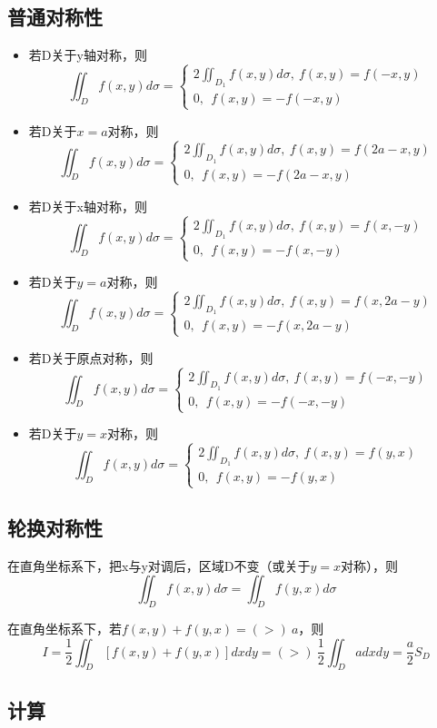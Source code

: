 \subsection{普通对称性}
\begin{itemize}
    \item 若D关于y轴对称，则\[\iint_Df(x, y)d\sigma = \begin{cases}
        2\iint_{D_1}f(x, y)d\sigma,\ f(x, y) = f(-x, y) \\
        0,\ \ f(x, y) = -f(-x, y)
    \end{cases}\]

    \item 若D关于\(x = a\)对称，则\[\iint_Df(x, y)d\sigma = \begin{cases}
        2\iint_{D_1}f(x, y)d\sigma,\ f(x, y) = f(2a - x, y) \\ 
        0,\ \ f(x, y) = -f(2a - x, y)
    \end{cases}\]

    \item 若D关于x轴对称，则\[\iint_Df(x, y)d\sigma = \begin{cases}
        2\iint_{D_1}f(x, y)d\sigma,\ f(x, y) = f(x, -y) \\ 
        0,\ \ f(x, y) = -f(x, -y)
    \end{cases}\]

    \item 若D关于\(y = a\)对称，则\[\iint_Df(x, y)d\sigma = \begin{cases}
        2\iint_{D_1}f(x, y)d\sigma,\ f(x, y) = f(x, 2a - y) \\ 
        0,\ \ f(x, y) = -f(x, 2a - y)
    \end{cases}\]

    \item 若D关于原点对称，则\[\iint_Df(x, y)d\sigma = \begin{cases}
        2\iint_{D_1}f(x, y)d\sigma,\ f(x, y) = f(-x, -y) \\ 
        0,\ \ f(x, y) = -f(-x, -y)
    \end{cases}\]

    \item 若D关于\(y = x\)对称，则\[\iint_Df(x, y)d\sigma = \begin{cases}
        2\iint_{D_1}f(x, y)d\sigma,\ f(x, y) = f(y, x) \\ 
        0,\ \ f(x, y) = -f(y, x)
    \end{cases}\]
\end{itemize}


\subsection{轮换对称性}
在直角坐标系下，把x与y对调后，区域D不变（或关于\(y = x\)对称），则
\[\iint_Df(x, y)d\sigma = \iint_Df(y, x)d\sigma\]

在直角坐标系下，若\(f(x, y) + f(y, x) =(>)\ a\)，则
\[I = \dfrac{1}{2}\iint_D[f(x, y) + f(y, x)]dxdy =(>)\ \dfrac{1}{2}\iint_Dadxdy = \dfrac{a}{2}S_D\]


\subsection{计算}


